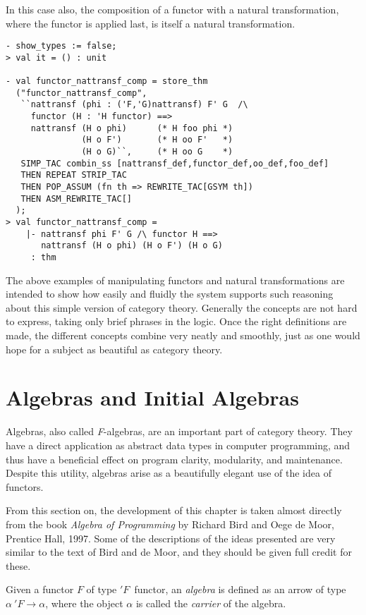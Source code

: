 In this case also, the composition of a functor with a natural transformation,
where the functor is applied last, is itself a natural transformation.
\begin{session}
\begin{verbatim}
- show_types := false;
> val it = () : unit

- val functor_nattransf_comp = store_thm
  ("functor_nattransf_comp",
   ``nattransf (phi : ('F,'G)nattransf) F' G  /\
     functor (H : 'H functor) ==>
     nattransf (H o phi)      (* H foo phi *)
               (H o F')       (* H oo F'   *)
               (H o G)``,     (* H oo G    *)
   SIMP_TAC combin_ss [nattransf_def,functor_def,oo_def,foo_def]
   THEN REPEAT STRIP_TAC
   THEN POP_ASSUM (fn th => REWRITE_TAC[GSYM th])
   THEN ASM_REWRITE_TAC[]
  );
> val functor_nattransf_comp =
    |- nattransf phi F' G /\ functor H ==>
       nattransf (H o phi) (H o F') (H o G)
     : thm
\end{verbatim}
\end{session}

The above examples of manipulating functors and natural transformations
are intended to show how easily and fluidly the \HOLW{} system supports
such reasoning about this simple version of category theory. Generally
the concepts are not hard to express, taking only brief phrases in the logic.
Once the right definitions are made, the different concepts combine
very neatly and smoothly, just as one would hope for a subject as beautiful
as category theory.


\section{Algebras and Initial Algebras}

Algebras, also called {\it F}-algebras, are an important part of category theory. 
They have a direct application as abstract data types in computer programming, 
and thus have a beneficial effect on program clarity, modularity, and maintenance.
Despite this utility, algebras arise as a beautifully elegant use of the idea of functors.

From this section on, the development of this chapter is taken almost directly from
the book {\it Algebra of Programming}\/ by Richard Bird and Oege de Moor, Prentice Hall,
1997. Some of the descriptions of the ideas presented are very similar to the text
of Bird and de Moor, and they should be given full credit for these.

Given a functor $F$ of type $'F$~{\sf functor}, an {\it algebra}\/ is defined
as an arrow of type $\alpha~'F \rightarrow \alpha$, where the object $\alpha$
is called the {\it carrier}\/ of the algebra.

